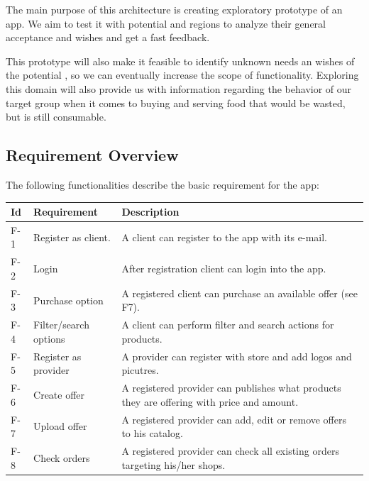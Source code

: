 The main purpose of this architecture is creating exploratory prototype of an \gls{app}. We aim to test it with potential 
 and regions to analyze their general acceptance and wishes \cite{refbook:DSHC} and get a fast feedback. 

This prototype will also make it feasible to identify unknown needs an wishes of the potential , so we 
can eventually increase the scope of functionality. Exploring this domain will also provide us with information regarding 
the behavior of our target group when it comes to buying and serving food that would be wasted, but is still consumable.

\subsection{Requirement Overview} \label{Requirement_Overview}

The following functionalities describe the basic requirement for the \gls{app}:

\begin{table}[H]
    \begin{tabularx}{\textwidth}{llX}
    \toprule
    Id & Requirement & Description  \\
    \midrule
    F-1 & Register as \gls{client}. & A \gls{client} can register to the app with its e-mail.\\
    F-2 & Login & After registration \gls{client} can login into the app. \\
    F-3 & Purchase option & A registered \gls{client} can purchase an available offer (see F7).\\
    F-4 & Filter/search options & A \gls{client} can perform filter and search actions for products.\\
    F-5 & Register as \gls{provider} & A \gls{provider} can register with store and add logos and picutres.\\
    F-6 & Create offer & A registered \gls{provider} can publishes what products they are offering with price 
    and amount. \\
    F-7 & Upload offer & A registered \gls{provider} can add, edit or remove offers to his catalog.\\
    F-8 & Check orders & A registered \gls{provider} can check all existing orders targeting his/her shops.\\
    \bottomrule
    \end{tabularx}
\end{table}

